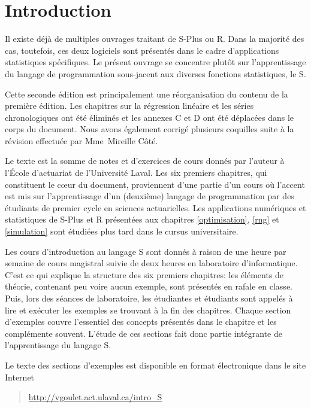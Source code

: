 \chapter*{Introduction}


Il existe déjà de multiples ouvrages traitant de S-Plus ou \textsf{R}.
Dans la majorité des cas, toutefois, ces deux logiciels sont présentés
dans le cadre d'applications statistiques spécifiques. Le présent
ouvrage se concentre plutôt sur l'apprentissage du langage de
programmation sous-jacent aux diverses fonctions statistiques, le S.

Cette seconde édition est principalement une réorganisation du contenu
de la première édition. Les chapitres sur la régression linéaire et
les séries chronologiques ont été éliminés et les annexes C et D
ont été déplacées dans le corps du document. Nous avons également
corrigé plusieurs coquilles suite à la révision effectuée par
Mme~Mireille Côté.

Le texte est la somme de notes et d'exercices de cours donnés par
l'auteur à l'École d'actuariat de l'Université Laval. Les six premiers
chapitres, qui constituent le c{\oe}ur du document, proviennent d'une
partie d'un cours où l'accent est mis sur l'apprentissage d'un
(deuxième) langage de programmation par des étudiants de premier cycle
en sciences actuarielles. Les applications numériques et statistiques
de S-Plus et \textsf{R} présentées aux chapitres \ref{optimisation},
\ref{rng} et \ref{simulation} sont étudiées plus tard dans le cursus
universitaire.

Les cours d'introduction au langage S sont donnés à raison de une
heure par semaine de cours magistral suivie de deux heures en
laboratoire d'informatique. C'est ce qui explique la structure des six
premiers chapitres: les éléments de théorie, contenant peu voire aucun
exemple, sont présentés en rafale en classe. Puis, lors des séances de
laboratoire, les étudiantes et étudiants sont appelés à lire et
exécuter les exemples se trouvant à la fin des chapitres. Chaque
section d'exemples couvre l'essentiel des concepts présentés dans le
chapitre et les complémente souvent. L'étude de ces sections fait donc
partie intégrante de l'apprentissage du langage S.

Le texte des sections d'exemples est disponible en format électronique
dans le site Internet
\begin{quote}
  \url{http://vgoulet.act.ulaval.ca/intro_S}
\end{quote}

